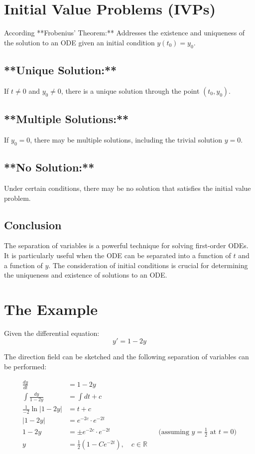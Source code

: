 \documentclass[11pt]{article}
\begin{document}
\section*{Initial Value Problems (IVPs)}
According **Frobenius’ Theorem:** Addresses the existence and uniqueness of the solution to an ODE given an initial condition \( y(t_0) = y_0 \).

\subsection*{**Unique Solution:** }
If \( t \neq 0 \) and \( y_0 \neq 0 \), there is a unique solution through the point \( (t_0, y_0) \).

\subsection*{**Multiple Solutions:** }
If \( y_0 = 0 \), there may be multiple solutions, including the trivial solution \( y = 0 \).

\subsection*{**No Solution:** }
Under certain conditions, there may be no solution that satisfies the initial value problem.

\subsection*{Conclusion}
The separation of variables is a powerful technique for solving first-order ODEs. It is particularly useful when the ODE can be separated into a function of \( t \) and a function of \( y \). The consideration of initial conditions is crucial for determining the uniqueness and existence of solutions to an ODE.
\section*{The Example}
Given the differential equation:
\[ y' = 1 - 2y \]

The direction field can be sketched and the following separation of variables can be performed:

\begin{align*}
\frac{dy}{dt} &= 1 - 2y \\
\int \frac{dy}{1 - 2y} &= \int dt + c \\
\frac{1}{-2} \ln |1 - 2y| &= t + c \\
|1 - 2y| &= e^{-2c} \cdot e^{-2t} \\
1 - 2y &= \pm e^{-2c} \cdot e^{-2t} && \text{(assuming $y = \frac{1}{2}$ at $t=0$)} \\
y &= \frac{1}{2}(1 - C e^{-2t}), \quad c \in \mathbb{R}
\end{align*}
\end{document}
